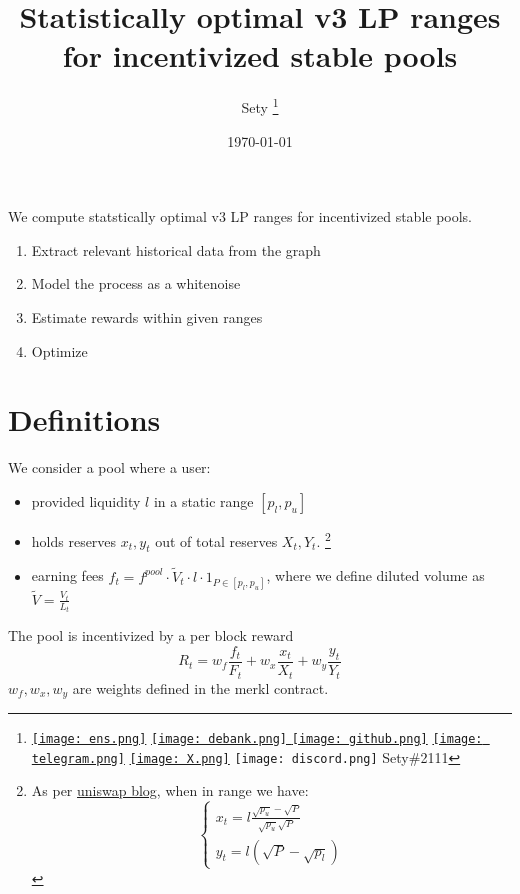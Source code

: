\documentclass[12pt]{article}
\begin{document}
\graphicspath{{/home/user/Documents/tex/assets/}}
\title{Statistically optimal v3 LP ranges for incentivized stable pools}
\author{Sety \footnote{
      \href{https://etherscan.io/address/0xFaf2A8b5fa78cA2786cEf5F7e19f6942EC7cB531}{\texttt{[image: ens.png]}}
      \href{https://debank.com/profile/0xfaf2a8b5fa78ca2786cef5f7e19f6942ec7cb531}{\texttt{[image: debank.png]} }
      \href{https://github.com/Sety-project}{\texttt{[image: github.png]}}
      \href{https://t.me/daviidarr}{\texttt{[image: telegram.png]}}
      \href{https://X.com/Sety08052022}{\texttt{[image: X.png]}}
      \texttt{[image: discord.png]} Sety\#2111
      }}

\date{\today}
\maketitle

\abstract We compute statstically optimal v3 LP ranges for incentivized stable pools. 
\begin{enumerate}
\item Extract relevant historical data from the graph
\item Model the process as a whitenoise
\item Estimate rewards within given ranges
\item Optimize
\end{enumerate}

\section{Definitions}
We  consider a pool where a user:
\begin{itemize}
      \item provided liquidity $l$ in a static range $[p_l, p_u]$
      \item holds reserves $x_t, y_t$ out of total reserves $X_t, Y_t$. 
      \footnote{As per \href{https://blog.uniswap.org/uniswap-v3-math-primer-2}{uniswap blog}, when in range we have:
      \[
      \begin{cases}
            x_t = l \frac{\sqrt{p_u}-\sqrt{P}}{\sqrt{p_u}\sqrt{P}} \\
            y_t = l (\sqrt{P}-\sqrt{p_l})
      \end{cases}
      \]}
      \item earning fees $f_t = f^{pool} \cdot \tilde{V}_t \cdot l \cdot 1_{P \in [p_l,p_u]}$, where we define diluted volume as $\tilde{V}=\frac{V_t}{L_t}$
\end{itemize}
The pool is incentivized by a per block reward 
\begin{equation} 
R_t = w_f \frac{f_t}{F_t} + w_x \frac{x_t}{X_t} + w_y \frac{y_t}{Y_t}
\end{equation}
$w_f, w_x, w_y$ are weights defined in the merkl contract.\\
\end{document}
